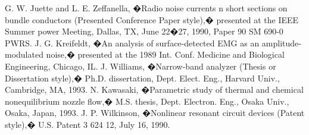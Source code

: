 \documentclass[letterpaper, 10 pt, conference]{IEEEconf}  %
\begin{document}
\begin{thebibliography}{99}
         G. W. Juette and L. E. Zeffanella, �Radio noise currents n short sections on bundle conductors (Presented Conference Paper style),� presented at the IEEE Summer power Meeting, Dallas, TX, June 22�27, 1990, Paper 90 SM 690-0 PWRS.
         J. G. Kreifeldt, �An analysis of surface-detected EMG as an amplitude-modulated noise,� presented at the 1989 Int. Conf. Medicine and Biological Engineering, Chicago, IL.
         J. Williams, �Narrow-band analyzer (Thesis or Dissertation style),� Ph.D. dissertation, Dept. Elect. Eng., Harvard Univ., Cambridge, MA, 1993. 
         N. Kawasaki, �Parametric study of thermal and chemical nonequilibrium nozzle flow,� M.S. thesis, Dept. Electron. Eng., Osaka Univ., Osaka, Japan, 1993.
         J. P. Wilkinson, �Nonlinear resonant circuit devices (Patent style),� U.S. Patent 3 624 12, July 16, 1990. 
        
        
        
        
        
        
        \end{thebibliography}
        
        
        
        
        
\end{document}

